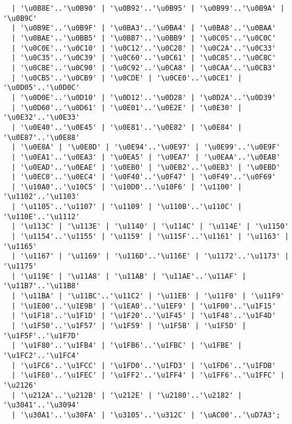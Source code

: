 \begin{verbatim}
  | '\u0B8E'..'\u0B90' | '\u0B92'..'\u0B95' | '\u0B99'..'\u0B9A' | '\u0B9C' 
  | '\u0B9E'..'\u0B9F' | '\u0BA3'..'\u0BA4' | '\u0BA8'..'\u0BAA' 
  | '\u0BAE'..'\u0BB5' | '\u0BB7'..'\u0BB9' | '\u0C05'..'\u0C0C' 
  | '\u0C0E'..'\u0C10' | '\u0C12'..'\u0C28' | '\u0C2A'..'\u0C33' 
  | '\u0C35'..'\u0C39' | '\u0C60'..'\u0C61' | '\u0C85'..'\u0C8C' 
  | '\u0C8E'..'\u0C90' | '\u0C92'..'\u0CA8' | '\u0CAA'..'\u0CB3' 
  | '\u0CB5'..'\u0CB9' | '\u0CDE' | '\u0CE0'..'\u0CE1' | '\u0D05'..'\u0D0C' 
  | '\u0D0E'..'\u0D10' | '\u0D12'..'\u0D28' | '\u0D2A'..'\u0D39' 
  | '\u0D60'..'\u0D61' | '\u0E01'..'\u0E2E' | '\u0E30' | '\u0E32'..'\u0E33' 
  | '\u0E40'..'\u0E45' | '\u0E81'..'\u0E82' | '\u0E84' | '\u0E87'..'\u0E88' 
  | '\u0E8A' | '\u0E8D' | '\u0E94'..'\u0E97' | '\u0E99'..'\u0E9F' 
  | '\u0EA1'..'\u0EA3' | '\u0EA5' | '\u0EA7' | '\u0EAA'..'\u0EAB' 
  | '\u0EAD'..'\u0EAE' | '\u0EB0' | '\u0EB2'..'\u0EB3' | '\u0EBD' 
  | '\u0EC0'..'\u0EC4' | '\u0F40'..'\u0F47' | '\u0F49'..'\u0F69' 
  | '\u10A0'..'\u10C5' | '\u10D0'..'\u10F6' | '\u1100' | '\u1102'..'\u1103' 
  | '\u1105'..'\u1107' | '\u1109' | '\u110B'..'\u110C' | '\u110E'..'\u1112' 
  | '\u113C' | '\u113E' | '\u1140' | '\u114C' | '\u114E' | '\u1150' 
  | '\u1154'..'\u1155' | '\u1159' | '\u115F'..'\u1161' | '\u1163' | '\u1165' 
  | '\u1167' | '\u1169' | '\u116D'..'\u116E' | '\u1172'..'\u1173' | '\u1175' 
  | '\u119E' | '\u11A8' | '\u11AB' | '\u11AE'..'\u11AF' | '\u11B7'..'\u11B8' 
  | '\u11BA' | '\u11BC'..'\u11C2' | '\u11EB' | '\u11F0' | '\u11F9' 
  | '\u1E00'..'\u1E9B' | '\u1EA0'..'\u1EF9' | '\u1F00'..'\u1F15' 
  | '\u1F18'..'\u1F1D' | '\u1F20'..'\u1F45' | '\u1F48'..'\u1F4D' 
  | '\u1F50'..'\u1F57' | '\u1F59' | '\u1F5B' | '\u1F5D' | '\u1F5F'..'\u1F7D' 
  | '\u1F80'..'\u1FB4' | '\u1FB6'..'\u1FBC' | '\u1FBE' | '\u1FC2'..'\u1FC4' 
  | '\u1FC6'..'\u1FCC' | '\u1FD0'..'\u1FD3' | '\u1FD6'..'\u1FDB' 
  | '\u1FE0'..'\u1FEC' | '\u1FF2'..'\u1FF4' | '\u1FF6'..'\u1FFC' | '\u2126' 
  | '\u212A'..'\u212B' | '\u212E' | '\u2180'..'\u2182' | '\u3041'..'\u3094' 
  | '\u30A1'..'\u30FA' | '\u3105'..'\u312C' | '\uAC00'..'\uD7A3';


\end{verbatim}

